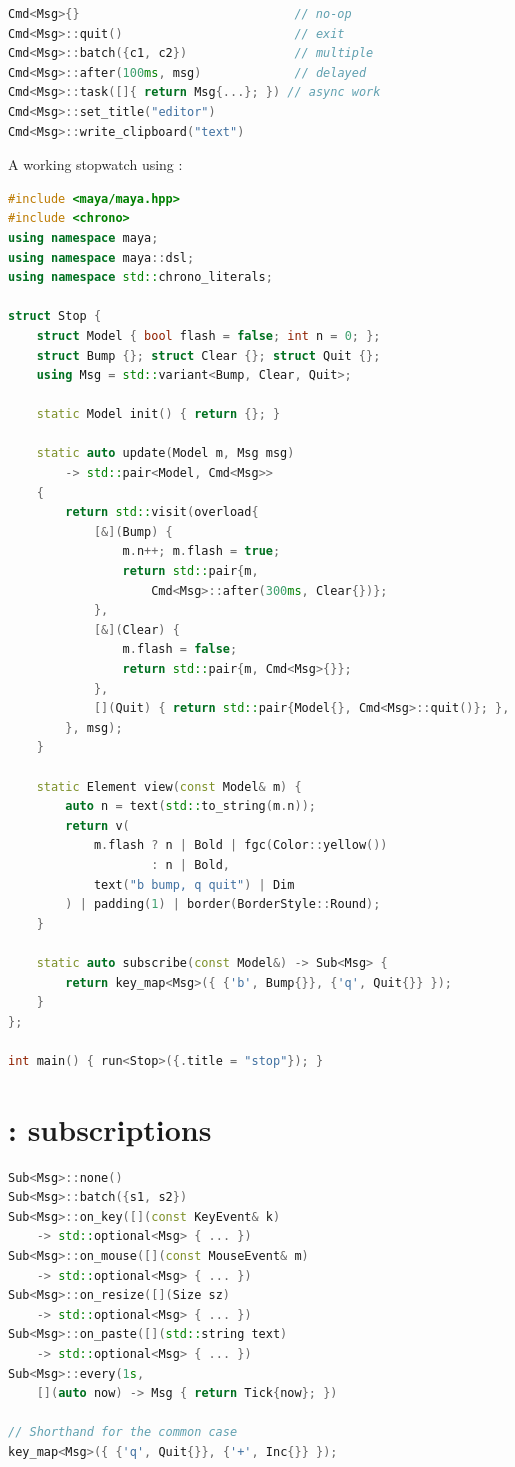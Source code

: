 \begin{lstlisting}[language=C++]
Cmd<Msg>{}                              // no-op
Cmd<Msg>::quit()                        // exit
Cmd<Msg>::batch({c1, c2})               // multiple
Cmd<Msg>::after(100ms, msg)             // delayed
Cmd<Msg>::task([]{ return Msg{...}; }) // async work
Cmd<Msg>::set_title("editor")
Cmd<Msg>::write_clipboard("text")
\end{lstlisting}

\noindent A working stopwatch using :

\begin{lstlisting}[language=C++]
#include <maya/maya.hpp>
#include <chrono>
using namespace maya;
using namespace maya::dsl;
using namespace std::chrono_literals;

struct Stop {
    struct Model { bool flash = false; int n = 0; };
    struct Bump {}; struct Clear {}; struct Quit {};
    using Msg = std::variant<Bump, Clear, Quit>;

    static Model init() { return {}; }

    static auto update(Model m, Msg msg)
        -> std::pair<Model, Cmd<Msg>>
    {
        return std::visit(overload{
            [&](Bump) {
                m.n++; m.flash = true;
                return std::pair{m,
                    Cmd<Msg>::after(300ms, Clear{})};
            },
            [&](Clear) {
                m.flash = false;
                return std::pair{m, Cmd<Msg>{}};
            },
            [](Quit) { return std::pair{Model{}, Cmd<Msg>::quit()}; },
        }, msg);
    }

    static Element view(const Model& m) {
        auto n = text(std::to_string(m.n));
        return v(
            m.flash ? n | Bold | fgc(Color::yellow())
                    : n | Bold,
            text("b bump, q quit") | Dim
        ) | padding(1) | border(BorderStyle::Round);
    }

    static auto subscribe(const Model&) -> Sub<Msg> {
        return key_map<Msg>({ {'b', Bump{}}, {'q', Quit{}} });
    }
};

int main() { run<Stop>({.title = "stop"}); }
\end{lstlisting}

\section{: subscriptions}

\begin{lstlisting}[language=C++]
Sub<Msg>::none()
Sub<Msg>::batch({s1, s2})
Sub<Msg>::on_key([](const KeyEvent& k)
    -> std::optional<Msg> { ... })
Sub<Msg>::on_mouse([](const MouseEvent& m)
    -> std::optional<Msg> { ... })
Sub<Msg>::on_resize([](Size sz)
    -> std::optional<Msg> { ... })
Sub<Msg>::on_paste([](std::string text)
    -> std::optional<Msg> { ... })
Sub<Msg>::every(1s,
    [](auto now) -> Msg { return Tick{now}; })

// Shorthand for the common case
key_map<Msg>({ {'q', Quit{}}, {'+', Inc{}} });
\end{lstlisting}

